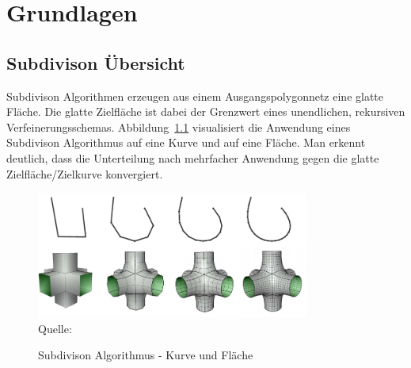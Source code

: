 \chapter{Grundlagen}


\section{Subdivison Übersicht}

Subdivison Algorithmen erzeugen aus einem Ausgangspolygonnetz eine glatte Fläche.
Die glatte Zielfläche ist dabei der Grenzwert eines unendlichen, rekursiven Verfeinerungsschemas.
Abbildung~\ref{fig:sd} visualisiert die Anwendung eines Subdivison Algorithmus auf eine Kurve und auf eine Fläche.
Man erkennt deutlich, dass die Unterteilung nach mehrfacher Anwendung gegen die glatte Zielfläche/Zielkurve konvergiert.
\begin{figure}[h]
  \caption{Subdivison Algorithmus - Kurve und Fläche}
  \centering
  \includegraphics[width=0.8\textwidth]{content/media/sd.png}
  \\Quelle: \cite{Standford.}
  \label{fig:sd}
\end{figure}

